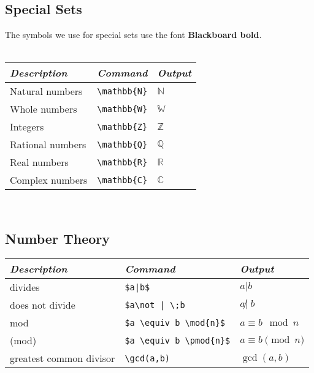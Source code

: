 \documentclass[12pt]{article}
\theoremstyle{definition}
\begin{document}
\subsection{Special Sets}
The symbols we use for special sets use the font \textbf{Blackboard bold}.
\\ \\
\begin{tabular}{| l | l | l |} \hline
\textit{Description} & \textit{Command} & \textit{Output}\\ \hline
Natural numbers & \verb!\mathbb{N}! & $\mathbb{N}$\\ \hline
Whole numbers & \verb!\mathbb{W}! & $\mathbb{W}$\\ \hline %
Integers & \verb!\mathbb{Z}! & $\mathbb{Z}$\\ \hline
Rational numbers & \verb!\mathbb{Q}! & $\mathbb{Q}$\\ \hline
Real numbers & \verb!\mathbb{R}! & $\mathbb{R}$\\ \hline
Complex numbers & \verb!\mathbb{C}! & $\mathbb{C}$\\ \hline
\end{tabular}
\\

\subsection{Number Theory}
\begin{tabular}{| l | l | l |} \hline
\textit{Description} & \textit{Command} & \textit{Output}\\ \hline
divides & \verb!$a|b$! & $a|b$\\ \hline
does not divide & \verb!$a\not | \;b! & $a\not | \;b$\\ \hline %
mod & \verb!$a \equiv b \mod{n}$! & $a \equiv b \mod{n}$\\ \hline
(mod) & \verb!$a \equiv b \pmod{n}$! & $a \equiv b \pmod{n}$\\ \hline
greatest common divisor & \verb!\gcd(a,b)! & $\gcd(a,b)$\\ \hline
\end{tabular}
\end{document}
